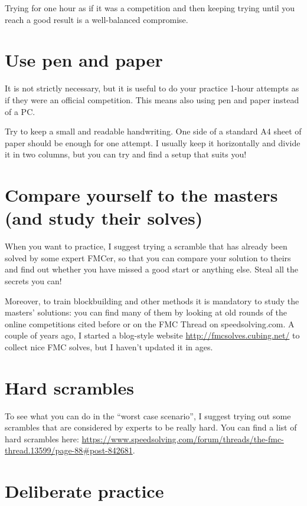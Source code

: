 \documentclass[11pt,a4paper]{book}
\begin{document}
Trying for one hour as if it was a competition and then keeping trying until you reach a good result is a well-balanced compromise.

\section{Use pen and paper}

It is not strictly necessary, but it is useful to do your practice 1-hour attempts as if they were an official competition. This means also using pen and paper instead of a PC.

Try to keep a small and readable handwriting. One side of a standard A4 sheet of paper should be enough for one attempt. I usually keep it horizontally and divide it in two columns, but you can try and find a setup that suits you!

\section{Compare yourself to the masters (and study their solves)}

When you want to practice, I suggest trying a scramble that has already been solved by some expert FMCer, so that you can compare your solution to theirs and find out whether you have missed a good start or anything else. Steal all the secrets you can!

Moreover, to train blockbuilding and other methods it is mandatory to study the masters' solutions: you can find many of them by looking at old rounds of the online competitions cited before or on the FMC Thread on speedsolving.com. A couple of years ago, I started a blog-style website \url{http://fmcsolves.cubing.net/} to collect nice FMC solves, but I haven't updated it in ages.

\section{Hard scrambles}

To see what you can do in the ``worst case scenario'', I suggest trying out some scrambles that are considered by experts to be really hard. You can find a list of hard scrambles here: \url{https://www.speedsolving.com/forum/threads/the-fmc-thread.13599/page-88\#post-842681}.

\section{Deliberate practice}
\end{document}

